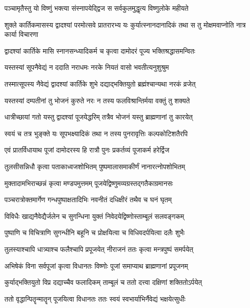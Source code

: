 \twolineshloka
{पञ्चामृतैस्तु यो विष्णुं भक्त्या संस्नापयेद्द्विज}
{स सर्वकुलमुद्धृत्य विष्णुलोके महीयते} %

\threelineshloka
{शुक्ले कार्तिकमासस्य द्वादश्यां परमोत्सवे}
{प्रातरारभ्य यः कुर्यात्स्नानदानादिकं तथा}
{स तु मोक्षमवाप्नोति नात्र कार्या विचारणा} %

\twolineshloka
{द्वादश्यां कार्तिके मासि स्नानसन्ध्यादिकर्म च}
{कृत्वा दामोदरं पूज्य भक्तिश्रद्धासमन्वितः} %

\twolineshloka
{यस्तस्यां सूपनैवेद्यं न ददाति नराधमः}
{नरके नियतं वासो भवतीत्यनुशुश्रुम} %

\twolineshloka
{तस्मात्सूपस्य नैवेद्यं द्वादश्यां कार्तिके शुभे}
{दद्याद्भक्तियुतो ब्रह्मंश्चान्यथा नरकं व्रजेत्} %

\twolineshloka
{यस्तस्यां दम्पतीनां तु भोजनं कुरुते नरः}
{न तस्य फलविश्रान्तिर्मया वक्तुं तु शक्यते} %

\twolineshloka
{धात्रीच्छायां गतो यस्तु द्वादश्यां पूजयेद्धरिम्}
{तत्रैव भोजनं यस्तु ब्राह्मणानां तु कारयेत्} %

\twolineshloka
{स्वयं च तत्र भुङ्क्ते यः सूपभक्ष्यादिकं तथा}
{न तस्य पुनरावृत्तिः कल्पकोटिशतैरपि} %

\twolineshloka
{एवं प्रातर्विधायाथ पूजां दामोदरस्य हि}
{रात्रौ पुनः प्रकर्तव्यं पूजाकर्म हरेर्द्विज} %

\twolineshloka
{तुलसीसन्निधौ कृत्वा पताकाध्वजशोभितम्}
{पुष्पमालासमाकीर्णं नानारत्नोपशोभितम्} %

\twolineshloka
{मुक्तादामभिराच्छन्नं कृत्वा मण्डपमुत्तमम्}
{पूजयेद्विष्णुमव्यग्रस्तद्गतैकाग्रमानसः} %

\twolineshloka
{पञ्चरात्रोक्तमार्गेण गन्धपुष्पाक्षतादिभिः}
{नवनीतं दधिक्षीरं तथैव च घनं घृतम्} %

\twolineshloka
{विविधैः खाद्यनैवेद्यैर्जलेन च सुगन्धिना}
{युक्तं निवेदयेद्विष्णोस्ताम्बूलं सलवङ्गकम्} %

\twolineshloka
{पुष्पाणि च विचित्राणि सुगन्धीनि बहूनि च}
{प्रोक्षयित्वा च विधिवदर्पयित्वा दलैः शुभैः} %

\twolineshloka
{तुलस्याश्चापि धात्र्याश्च फलैश्चापि प्रपूजयेत्}
{नीराजनं ततः कृत्वा मन्त्रपुष्पं समर्पयेत्} %

\twolineshloka
{अभिषेकं विना सर्वपूजां कृत्वा विधानतः}
{विष्णोः पूजां समाप्याथ ब्राह्मणानां प्रपूजनम्} %

\twolineshloka
{कुर्याद्भक्तियुतो विप्र दद्याच्चैव फलादिकम्}
{ताम्बूलं च ततो दत्त्वा दक्षिणां शक्तितोऽर्पयेत्} %

\twolineshloka
{ततो वृद्धान्पितॄन्मातॄन् पूजयित्वा विधानतः}
{ततः स्वयं स्वभार्याभिर्नैवेद्यं भक्षयेत्सुधीः} %


